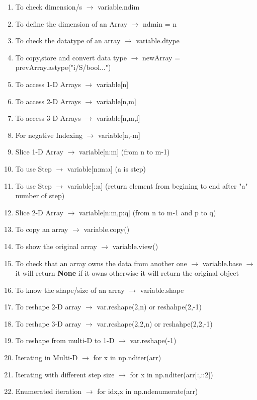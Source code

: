 \documentclass[openany]{book}
\begin{document}
\begin{enumerate}
    \item To check dimension/s $\rightarrow$ variable.ndim 
    \item To define the dimension of an Array $\rightarrow$ ndmin = n 
    \item To check the datatype of an array $\rightarrow$ variable.dtype
    \item To copy,store and convert data type $\rightarrow$ newArray = prevArray.astype("i/S/bool...")
    \item To access 1-D Arrays $\rightarrow$ variable[n]
    \item To access 2-D Arrays $\rightarrow$ variable[n,m]
    \item To access 3-D Arrays $\rightarrow$ variable[n,m,l]
    \item For negative Indexing $\rightarrow$ variable[n,-m]
    \item Slice 1-D Array $\rightarrow$ variable[n:m] (from n to m-1)
    \item To use Step $\rightarrow$ variable[n:m:a] (a is step)
    \item To use Step $\rightarrow$ variable[::a] (return element from begining to end after "a" number of step)
    \item Slice 2-D Array $\rightarrow$ variable[n:m,p:q] (from n to m-1 and p to q)
    \item To copy an array $\rightarrow$ variable.copy()
    \item To show the original array $\rightarrow$ variable.view()
    \item To check that an array owns the data from another one $\rightarrow$ variable.base $\rightarrow$ it will return \textbf{None} if it owns otherwise it will return the original object
    \item To know the shape/size of an array $\rightarrow$ variable.shape
    \item To reshape 2-D array $\rightarrow$ var.reshape(2,n) or reshahpe(2,-1)
    \item To reshape 3-D array $\rightarrow$ var.reshape(2,2,n) or reshahpe(2,2,-1)
    \item To reshape from multi-D to 1-D $\rightarrow$ var.reshape(-1)
    \item Iterating in Multi-D $\rightarrow$ for x in np.nditer(arr)
    \item Iterating with different step size $\rightarrow$ for x in np.nditer(arr[:,::2])
    \item Enumerated iteration $\rightarrow$ for idx,x in np.ndenumerate(arr)

\end{enumerate}
\end{document}
